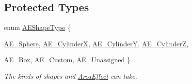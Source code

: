 \subsection*{Protected Types}
\begin{DoxyCompactItemize}
\item 
enum \hyperlink{classphys_1_1AreaEffect_a99b8746c43eac266d48ad613110dc6f9}{AEShapeType} \{ \par
\hyperlink{classphys_1_1AreaEffect_a99b8746c43eac266d48ad613110dc6f9a607185bf8c230fe2c39df9d96bd66a09}{AE\_\-Sphere}, 
\hyperlink{classphys_1_1AreaEffect_a99b8746c43eac266d48ad613110dc6f9a623ebbf1c726ad947a74aff5d36d3b8f}{AE\_\-CylinderX}, 
\hyperlink{classphys_1_1AreaEffect_a99b8746c43eac266d48ad613110dc6f9a363e015e6e77fb2f74b63e5dd687a981}{AE\_\-CylinderY}, 
\hyperlink{classphys_1_1AreaEffect_a99b8746c43eac266d48ad613110dc6f9a001df4767697c5c30d2c7b4f318301ba}{AE\_\-CylinderZ}, 
\par
\hyperlink{classphys_1_1AreaEffect_a99b8746c43eac266d48ad613110dc6f9a579014c1569b6129ee8b2cf74e3a14e4}{AE\_\-Box}, 
\hyperlink{classphys_1_1AreaEffect_a99b8746c43eac266d48ad613110dc6f9a1c411d786f32da69b69e6f8dae26f977}{AE\_\-Custom}, 
\hyperlink{classphys_1_1AreaEffect_a99b8746c43eac266d48ad613110dc6f9a9eef62b75d698ff6ef4e74bd2a2df132}{AE\_\-Unassigned}
 \}
\begin{DoxyCompactList}\small\item\em The kinds of shapes and \hyperlink{classphys_1_1AreaEffect}{AreaEffect} can take. \item\end{DoxyCompactList}\end{DoxyCompactItemize}
